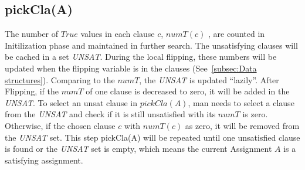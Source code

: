 \documentclass[12pt,a4paper,twoside]{scrartcl}
\numberwithin{equation}{section}
\begin{document}
\subsection{pickCla(A)}
The number of $True$ values in each clause $c$, $numT(c)$ , are counted in Initilization phase and maintained in further search. The unsatisfying clauses will be cached in a set \emph{UNSAT}. During the local flipping, these numbers will be updated when the flipping variable is in the clauses (See~\ref{subsec:Data structures}).  Comparing to the $numT$, the \emph{UNSAT} is updated  ``lazily''. After Flipping, if the $numT$ of one clause is decreased to zero, it will be added in the \emph{UNSAT}.  To select an unsat clause in $pickCla(A)$, man needs to select a clause from the \emph{UNSAT} and check if it is still unsatisfied with its $numT$ is zero. Otherwise, if the chosen clause $c$ with $numT(c)$ as zero, it will be removed from the \emph{UNSAT} set. This step pickCla(A) will be repeated until one unsatisfied clause is found or the \emph{UNSAT} set is empty, which means the current Assignment $A$ is a satisfying assignment.\\ 
\\
\end{document}
